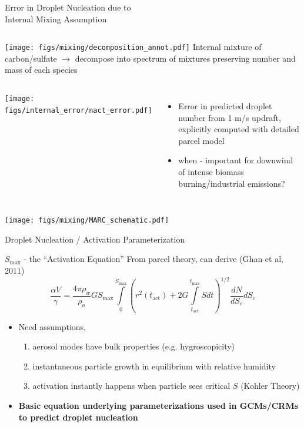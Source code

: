 \documentclass[9pt,pdf,mathserif]{beamer}
\begin{document}
\begin{frame}{Error in Droplet Nucleation due to\\Internal Mixing Assumption}
\begin{columns}
		\centering
		\texttt{[image: figs/mixing/decomposition\_annot.pdf]}
		Internal mixture of carbon/sulfate $\rightarrow$ decompose into spectrum of mixtures preserving number and mass of each species
\end{columns}
\vspace{-0.2cm}
\begin{columns}
		\centering
		\texttt{[image: figs/internal\_error/nact\_error.pdf]}
		\begin{itemize}
		\vspace{-0.5cm}
		\item Error in predicted droplet number from 1 m/s updraft, explicitly computed with detailed parcel model
		\vspace{0.5cm}
		\item \textbf{\color{red}{+100\% error}} when \textbf{\color{red}{mostly carbon}} - important for downwind of intense biomass burning/industrial emissions? 
		\end{itemize}
\end{columns}
\end{frame}

\begin{frame} %
\centering
\texttt{[image: figs/mixing/MARC\_schematic.pdf]}
\end{frame}

\begin{frame}{Droplet Nucleation / Activation Parameterization}
\begin{block}{$S_\text{max}$ - the ``Activation Equation''}
	From parcel theory, can derive (Ghan et al, 2011)
	$$\frac{\alpha V}{\gamma} = \frac{4\pi\rho_w}{\rho_a}G S_\text{max}\int\limits_0^{S_\text{max}}\left(r^2(t_\text{act}) + 2G\int\limits_{t_\text{act}}^{t_\text{max}} S dt \right)^{1/2}\frac{dN}{dS_c}dS_c$$
\end{block}
\vspace{1cm}
\begin{itemize}
	\item Need assumptions,
		\begin{enumerate}
		\item aerosol modes have bulk properties (e.g. hygroscopicity)
		\item instantaneous particle growth in equilibrium with relative humidity
		\item activation instantly happens when particle sees critical $S$ (Kohler Theory)
		\end{enumerate}
	\vspace{0.5cm}
	\item \textbf{Basic equation underlying parameterizations used in GCMs/CRMs to predict droplet nucleation}
\end{itemize}
\end{frame}
\end{document}
